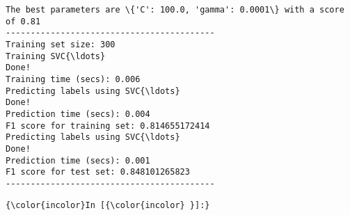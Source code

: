 \documentclass{article}
\begin{document}
    \begin{Verbatim}[commandchars=\\\{\}]
The best parameters are \{'C': 100.0, 'gamma': 0.0001\} with a score of 0.81
------------------------------------------
Training set size: 300
Training SVC{\ldots}
Done!
Training time (secs): 0.006
Predicting labels using SVC{\ldots}
Done!
Prediction time (secs): 0.004
F1 score for training set: 0.814655172414
Predicting labels using SVC{\ldots}
Done!
Prediction time (secs): 0.001
F1 score for test set: 0.848101265823
------------------------------------------
    \end{Verbatim}

    \begin{Verbatim}[commandchars=\\\{\}]
{\color{incolor}In [{\color{incolor} }]:} 
\end{Verbatim}


    
    
    
    
\end{document}

